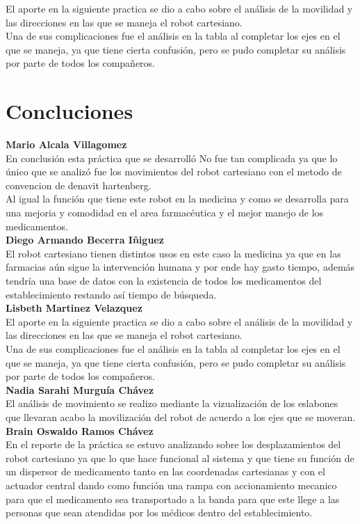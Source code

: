 \documentclass[letter,openridht,12pt,spanish]{report}
\begin{document}
El aporte en la siguiente practica se dio a cabo sobre el análisis de la movilidad y las direcciones en las que se maneja el robot cartesiano.\\
Una de sus complicaciones fue el análisis en la tabla al completar los ejes en el que se maneja, ya que tiene cierta confusión, pero se pudo completar su análisis por parte de todos los compañeros.
\section{Concluciones}

\textbf{Mario Alcala Villagomez}\\
En conclusi\'on esta pr\'actica que se desarroll\'o No fue tan complicada ya que lo único que se analiz\'o fue los movimientos del robot cartesiano con el metodo de convencion de denavit hartenberg.\\
Al igual la funci\'on que tiene este robot en la medicina y como se desarrolla para una mejoria y comodidad en el area farmac\'eutica y el mejor manejo de los medicamentos.\\
\textbf{Diego Armando Becerra I\~niguez}\\
El robot cartesiano tienen distintos usos en este caso la medicina ya que en las farmacias a\'un sigue la intervenci\'on humana y por ende hay gasto tiempo, además tendr\'ia una base de datos con la existencia de todos los medicamentos del establecimiento restando as\'i tiempo de b\'usqueda.\\
\textbf{Lisbeth Martinez Velazquez}\\
El aporte en la siguiente practica se dio a cabo sobre el análisis de la movilidad y las direcciones en las que se maneja el robot cartesiano.\\
Una de sus complicaciones fue el análisis en la tabla al completar los ejes en el que se maneja, ya que tiene cierta confusión, pero se pudo completar su análisis por parte de todos los compañeros.\\
\textbf{Nadia Sarahi Murgu\'ia Ch\'avez}\\
El an\'alisis de movimiento se realizo mediante la vizualizaci\'on de los eslabones que llevaran acabo la movilizaci\'on del robot de acuerdo a los ejes que se moveran.\\
\textbf{Brain Oswaldo Ramos Ch\'avez}\\
En el reporte de la pr\'actica se estuvo analizando sobre los desplazamientos del robot cartesiano ya que lo que hace funcional al sistema y que tiene su función de un dispersor de medicamento tanto en las coordenadas cartesianas y con el actuador central dando como funci\'on una rampa con accionamiento mecanico para que el medicamento sea transportado a la banda para que este llege a las personas que sean atendidas por los médicos dentro del establecimiento.\\
\end{document}
